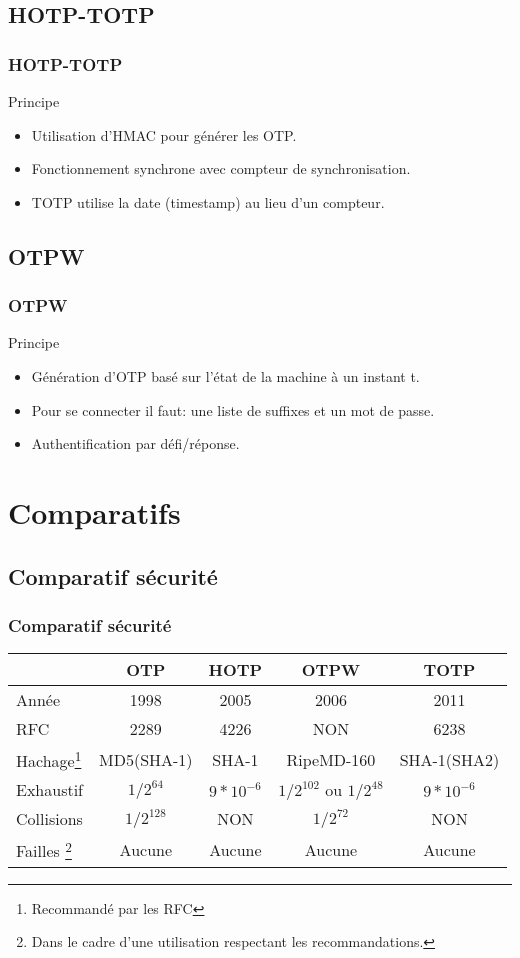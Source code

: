 \documentclass{beamer}
\begin{document}
\subsection{HOTP-TOTP}
\begin{frame}
\frametitle{HOTP-TOTP}
 \begin{block}{Principe}
 \begin{itemize}
 \item Utilisation d'HMAC pour générer les OTP.
 \item Fonctionnement synchrone avec compteur de synchronisation.
 \item TOTP utilise la date (timestamp) au lieu d'un compteur.
 \end{itemize}
 \end{block}
\end{frame}

\subsection{OTPW}
\begin{frame}
\frametitle{OTPW}
  \begin{block}{Principe}
   \begin{itemize}
    \item Génération d'OTP basé sur l'état de la machine à un instant t.
    \item Pour se connecter il faut: une liste de suffixes et un mot de passe.
    \item Authentification par défi/réponse.
   \end{itemize}
  \end{block}
\end{frame}


\section{Comparatifs}
\subsection{Comparatif sécurité}
\begin{frame}
  \frametitle{Comparatif sécurité}
  \begin{tabular}{|l|c|c|c|c|}
 \hline
 & OTP & HOTP & OTPW & TOTP\\
 \hline
 Année & 1998 & 2005 & 2006 & 2011 \\
 \hline
 RFC & 2289 & 4226 & NON & 6238 \\
 \hline
 Hachage\footnote{Recommandé par les RFC} & MD5(SHA-1) & SHA-1 & RipeMD-160 & SHA-1(SHA2)\\
 \hline
 Exhaustif & $1/2^{64}$ & $9*10^{-6} $ & $1/2^{102}$ ou $1/2^{48}$ & $9*10^{-6}$\\
 \hline
 Collisions & $1/2^{128}$ & NON & $1/2^{72}$ & NON\\
 \hline
 Failles \footnote{Dans le cadre d'une utilisation respectant les recommandations.} & Aucune & Aucune& Aucune &Aucune\\
 \hline
  \end{tabular}
\end{frame}
\end{document}
